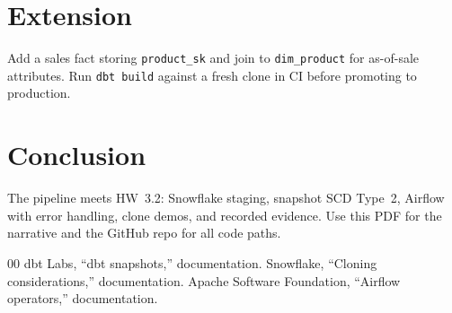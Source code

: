 \documentclass[conference]{IEEEtran}
\begin{document}
\section{Extension}
Add a sales fact storing \texttt{product\_sk} and join to
\texttt{dim\_product} for as-of-sale attributes. Run \texttt{dbt build}
against a fresh clone in CI before promoting to production.

\section{Conclusion}
The pipeline meets HW~3.2: Snowflake staging, snapshot SCD Type~2,
Airflow with error handling, clone demos, and recorded evidence.
Use this PDF for the narrative and the GitHub repo for all code paths.

\begin{thebibliography}{00}
 dbt Labs, ``dbt snapshots,'' documentation.
 Snowflake, ``Cloning considerations,'' documentation.
 Apache Software Foundation, ``Airflow operators,'' documentation.
\end{thebibliography}
\end{document}
